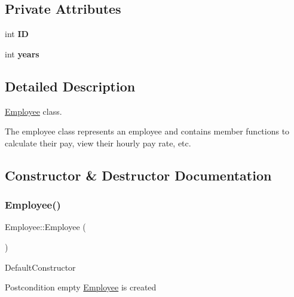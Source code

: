 \subsection*{Private Attributes}
\begin{DoxyCompactItemize}
\item 
\mbox{\label{classEmployee_a832bbae4ee8a704b917f82c4d497bbac}} 
int {\bfseries ID}
\item 
\mbox{\label{classEmployee_a3e4862d9dfc73becb459a562fa2e25f5}} 
int {\bfseries years}
\end{DoxyCompactItemize}


\subsection{Detailed Description}
\hyperlink{classEmployee}{Employee} class. 

The employee class represents an employee and contains member functions to calculate their pay, view their hourly pay rate, etc. 

\subsection{Constructor \& Destructor Documentation}
\mbox{\label{classEmployee_a003c7bd08c40924e381eb0750cbb906f}} 
\subsubsection{\texorpdfstring{Employee()}{Employee()}\hspace{0.1cm}{\footnotesize\ttfamily [1/2]}}
{\footnotesize\ttfamily Employee\+::\+Employee (\begin{DoxyParamCaption}{ }\end{DoxyParamCaption})}

Default\+Constructor

\begin{DoxyPostcond}{Postcondition}
empty \hyperlink{classEmployee}{Employee} is created 
\end{DoxyPostcond}
\mbox{\label{classEmployee_ad0c935ef9a290a82dcf7865172c90148}} 
